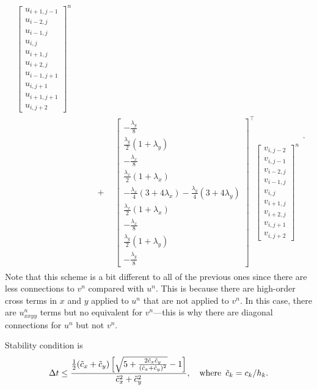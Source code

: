 \documentclass[12pt]{article}
\begin{document}
\begin{align}
\begin{aligned}
\begin{bmatrix}
u_{i+1,j-1} \\
u_{i-2,j} \\
u_{i-1,j} \\
u_{i,j} \\
u_{i+1,j} \\
u_{i+2,j} \\
u_{i-1,j+1} \\
u_{i,j+1} \\
u_{i+1,j+1} \\
u_{i,j+2} 
\end{bmatrix}^n 
\\
& \quad \quad + \quad
\begin{bmatrix}
-\tfrac{\lambda_y}{8} \\
\tfrac{\lambda_y}{2}(1 + \lambda_y) \\  
-\tfrac{\lambda_x}{8} \\
\tfrac{\lambda_x}{2}(1 + \lambda_x) \\
-\tfrac{\lambda_x}{4}(3 + 4 \lambda_x) - \tfrac{\lambda_y}{4}(3 + 4 \lambda_y) \\
\tfrac{\lambda_x}{2}(1 + \lambda_x) \\
-\tfrac{\lambda_x}{8} \\
\tfrac{\lambda_y}{2}(1 + \lambda_y) \\  
-\tfrac{\lambda_y}{8} 
\end{bmatrix}^\top
\begin{bmatrix}
v_{i,j-2} \\
v_{i,j-1} \\
v_{i-2,j} \\
v_{i-1,j} \\
v_{i,j} \\
v_{i+1,j} \\
v_{i+2,j} \\
v_{i,j+1} \\
v_{i,j+2} 
\end{bmatrix}^n 
\end{aligned}.
\end{align}
Note that this scheme is a bit different to all of the previous ones since there are less connections to $v^n$ compared with $u^n$. This is because there are high-order cross terms in $x$ and $y$ applied to $u^n$ that are not applied to $v^n$. In this case, there are $u^n_{xxyy}$ terms but no equivalent for $v^n$---this is why there are diagonal connections for $u^n$ but not $v^n$.

Stability condition is \cite[eq. (107)]{Banks2012}
\begin{align}
\Delta t \leq \frac{\tfrac{1}{2} (\tilde{c}_x + \tilde{c}_y)\left[ \sqrt{5 + \tfrac{2 \tilde{c}_x \tilde{c}_y}{(\tilde{c}_x + \tilde{c}_y)^2}} - 1 \right]}{\tilde{c}_x^2 + \tilde{c}_y^2}, \quad \textrm{where \,} \tilde{c}_k = c_k / h_k.
\end{align}




\end{document}
